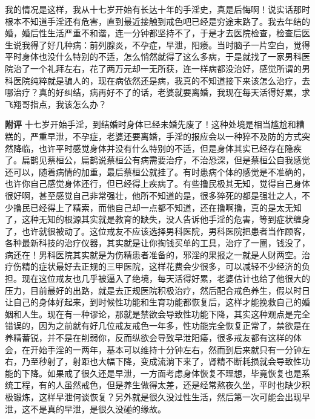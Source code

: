 \begin{case}
    我的情况是这样，我从十七岁开始有长达十年的手淫史，真是后悔啊！说实话那时根本不知道手淫还有危害，直到最近接触到戒色吧已经是穷途末路了。我去年结的婚，婚后性生活严重不和谐，连一分钟都坚持不了，于是才去医院检查，检查后医生说我得了好几种病：前列腺炎，不孕症，早泄，阳痿。当时脑子一片空白，觉得平时身体也没什么特别的不适，怎么悄然就得了这么多病，于是就找了一家男科医院治了一个礼拜左右，花了两万元却一无所获，连一样病都没治好，感觉所谓的男科医院纯粹就是骗人的，现在病依然还是病，我真的不知道接下来该怎么治疗，去哪治疗？真的好纠结，病再好不了的话，老婆就要离婚，我现在每天活得好累，求飞翔哥指点，我该怎么办？

    \textbf{附评} 十七岁开始手淫，到结婚时身体已经未婚先废了！这种处境是相当尴尬和糟糕的，严重早泄，不孕症，老婆还要离婚，手淫的报应会以一种猝不及防的方式突然降临，也许平时感觉身体并没有什么特别的不适，但是身体其实已经存在隐疾了。扁鹊见蔡桓公，扁鹊说蔡桓公有病需要治疗，不治恐深，但是蔡桓公自我感觉还可以，随着病情的加重，最后蔡桓公就挂了。有时患病个体的感觉是不准确的，也许你自己感觉身体还行，但已经得上疾病了。有些撸民极其无知，觉得自己身体很好啊，甚至感觉自己非常强壮，他所不知道的是，很多猝死的都是强壮之人，不少撸民已经得上了精索，而他自己却一点都不知道，还在撸啊撸，真的是太无知了，这种无知的根源其实就是教育的缺失，没人告诉他手淫的危害，等到症状缠身了，也许就很被动了。这位戒友不应该选择男科医院，男科医院把患者当作顾客，各种最新科技的治疗仪器，其实就是让你掏钱买单的工具，治疗了一圈，钱没了，病还在！男科医院其实就是为伤精患者准备的，邪淫的果报之一就是人财两空。治疗伤精的症状最好去正规的三甲医院，这样花费会少很多，可以减轻不少经济的负担。现在这位戒友也几乎被逼入了绝境，每天活得好累，老婆估计也给了他很大的压力，目前最好的出路，就是去正规医院积极治疗，然后配合戒色养生，假以时日让自己的身体好起来，到时候性功能和生育功能都恢复后，这样才能挽救自己的婚姻和人生。现在有一种谬论，那就是禁欲会导致性功能下降，其实这种观点是完全错误的，因为之前就有好几位戒友戒色一年多，性功能完全恢复正常了，禁欲是在养精蓄锐，并不是在削弱你，反而纵欲会导致早泄阳痿，很多戒友都有这样的体会，在开始手淫的一两年，基本可以维持十分钟左右，然而到后来就只有一分钟左右，乃至秒射了，射距也大幅下降，变成流淌下来了，肾精不断耗损就会导致性功能的下降。如果戒了很久还是早泄，一方面考虑身体恢复不理想，毕竟恢复也是系统工程，有的人虽然戒色，但是养生做得太差，还是经常熬夜久坐，平时也缺少积极锻炼，这样早泄何谈恢复？另外就是很久没过性生活，然后第一次可能会出现早泄，这不是真的早泄，是很久没碰的缘故。
\end{case}

